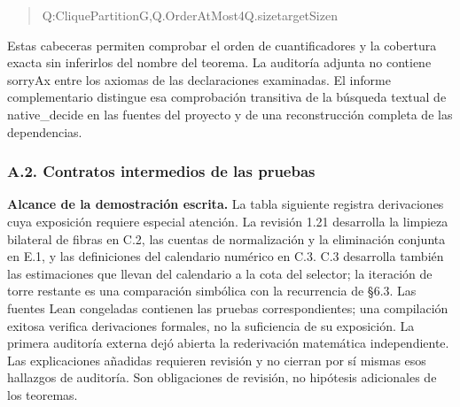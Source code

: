 \documentclass[spanish,11pt,a4paper]{article}
\newlength{\LeanCharWidth}
\begin{document}
\begin{quote}
\noindent \hspace*{\dimexpr 8\LeanCharWidth\relax}{\LeanSymbols ∃}\hspace*{\dimexpr 1\LeanCharWidth\relax}Q\hspace*{\dimexpr 1\LeanCharWidth\relax}:\hspace*{\dimexpr 1\LeanCharWidth\relax}CliquePartition\hspace*{\dimexpr 1\LeanCharWidth\relax}G,\hspace*{\dimexpr 1\LeanCharWidth\relax}Q.OrderAtMost\hspace*{\dimexpr 1\LeanCharWidth\relax}4\hspace*{\dimexpr 1\LeanCharWidth\relax}{\LeanSymbols ∧}\hspace*{\dimexpr 1\LeanCharWidth\relax}Q.size\hspace*{\dimexpr 1\LeanCharWidth\relax}{\LeanSymbols ≤}\hspace*{\dimexpr 1\LeanCharWidth\relax}targetSize\hspace*{\dimexpr 1\LeanCharWidth\relax}n\par
\end{quote}

Estas cabeceras permiten comprobar el orden de cuantificadores y la cobertura exacta sin inferirlos del nombre del teorema. La auditoría adjunta no contiene {\ttfamily\small sorryAx} entre los axiomas de las declaraciones examinadas. El informe complementario distingue esa comprobación transitiva de la búsqueda textual de {\ttfamily\small native\_\discretionary{\hbox{\ensuremath{\hookrightarrow}}}{}{}decide} en las fuentes del proyecto y de una reconstrucción completa de las dependencias.

\subsubsection{A.2. Contratos intermedios de las pruebas}\label{a.2.-contratos-intermedios-de-las-pruebas}

\textbf{Alcance de la demostración escrita.} La tabla siguiente registra derivaciones cuya exposición requiere especial atención. La revisión 1.21 desarrolla la limpieza bilateral de fibras en C.2, las cuentas de normalización y la eliminación conjunta en E.1, y las definiciones del calendario numérico en C.3. C.3 desarrolla también las estimaciones que llevan del calendario a la cota del selector; la iteración de torre restante es una comparación simbólica con la recurrencia de §6.3. Las fuentes Lean congeladas contienen las pruebas correspondientes; una compilación exitosa verifica derivaciones formales, no la suficiencia de su exposición. La primera auditoría externa dejó abierta la rederivación matemática independiente. Las explicaciones añadidas requieren revisión y no cierran por sí mismas esos hallazgos de auditoría. Son obligaciones de revisión, no hipótesis adicionales de los teoremas.
\end{document}
